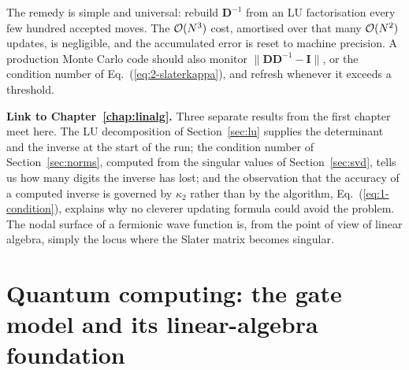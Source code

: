 The remedy is simple and universal: rebuild $\bm{D}^{-1}$ from an LU
factorisation every few hundred accepted moves.  The $\mathcal{O}(N^3)$ cost,
amortised over that many $\mathcal{O}(N^2)$ updates, is negligible, and the
accumulated error is reset to machine precision.  A production Monte Carlo
code should also monitor $\|\bm{D}\bm{D}^{-1}-\bm{I}\|$, or the condition
number of Eq.~(\ref{eq:2-slaterkappa}), and refresh whenever it exceeds a
threshold.

\begin{notebox}
\textbf{Link to Chapter~\ref{chap:linalg}.} Three separate results from the
first chapter meet here.  The LU decomposition of Section~\ref{sec:lu}
supplies the determinant and the inverse at the start of the run; the
condition number of Section~\ref{sec:norms}, computed from the singular values
of Section~\ref{sec:svd}, tells us how many digits the inverse has lost; and
the observation that the accuracy of a computed inverse is governed by
$\kappa_2$ rather than by the algorithm, Eq.~(\ref{eq:1-condition}), explains
why no cleverer updating formula could avoid the problem.  The nodal surface
of a fermionic wave function is, from the point of view of linear algebra,
simply the locus where the Slater matrix becomes singular.
\end{notebox}

\section{Quantum computing: the gate model and its linear-algebra foundation}
\label{sec:qcgates}

